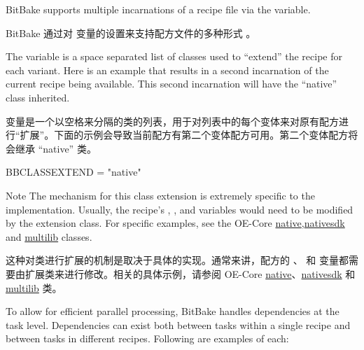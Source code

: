 
BitBake supports multiple incarnations of a recipe file via the  variable.

BitBake 通过对  变量的设置来支持配方文件的多种形式 。

The  variable is a space separated list of classes used to ``extend'' the recipe for each variant. Here is an example that results in a second incarnation of the current recipe being available. This second incarnation will have the ``native'' class inherited.

 变量是一个以空格来分隔的类的列表，用于对列表中的每个变体来对原有配方进行``扩展''。下面的示例会导致当前配方有第二个变体配方可用。第二个变体配方将会继承 ``native'' 类。

\begin{pyglist}
BBCLASSEXTEND = "native"
\end{pyglist}

\begin{noteblock}{Note}%
The mechanism for this class extension is extremely specific to the implementation. Usually, the recipe's ,  , and  variables would need to be modified by the extension class. For specific examples, see the OE-Core \href{https://docs.yoctoproject.org/ref-manual/classes.html#native}{native},\href{https://docs.yoctoproject.org/ref-manual/classes.html#nativesdk}{nativesdk} and \href{https://docs.yoctoproject.org/ref-manual/classes.html#multilib}{multilib} classes.

\medskip
这种对类进行扩展的机制是取决于具体的实现。通常来讲，配方的 、 和  变量都需要由扩展类来进行修改。相关的具体示例，请参阅 OE-Core \href{https://docs.yoctoproject.org/ref-manual/classes.html#native}{native}、\href{https://docs.yoctoproject.org/ref-manual/classes.html#nativesdk}{nativesdk} 和 \href{https://docs.yoctoproject.org/ref-manual/classes.html#multilib}{multilib} 类。


\end{noteblock}

\label{section:Dependencies}

To allow for efficient parallel processing, BitBake handles dependencies at the task level. Dependencies can exist both between tasks within a single recipe and between tasks in different recipes. Following are examples of each:

